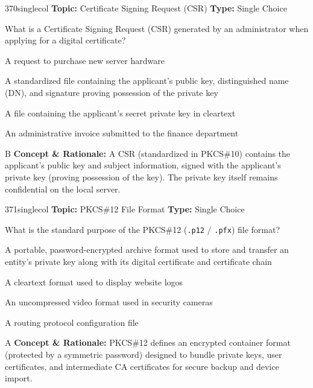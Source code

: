 \begin{qcard}{370}{singlecol}
\textcolor{darkslate!75}{\small\textbf{Topic:} Certificate Signing Request (CSR) \hfill \textbf{Type:} Single Choice}\vspace{0.4em}\par
What is a Certificate Signing Request (CSR) generated by an administrator when applying for a digital certificate?
\begin{qoptions}
\item A request to purchase new server hardware
\item A standardized file containing the applicant's public key, distinguished name (DN), and signature proving possession of the private key
\item A file containing the applicant's secret private key in cleartext
\item An administrative invoice submitted to the finance department
\end{qoptions}
\end{qcard}
\nopagebreak
\begin{explainbox}{B}
\textbf{Concept \& Rationale:} A CSR (standardized in PKCS\#10) contains the applicant's public key and subject information, signed with the applicant's private key (proving possession of the key). The private key itself remains confidential on the local server.
\end{explainbox}

\begin{qcard}{371}{singlecol}
\textcolor{darkslate!75}{\small\textbf{Topic:} PKCS\#12 File Format \hfill \textbf{Type:} Single Choice}\vspace{0.4em}\par
What is the standard purpose of the PKCS\#12 (\texttt{.p12} / \texttt{.pfx}) file format?
\begin{qoptions}
\item A portable, password-encrypted archive format used to store and transfer an entity's private key along with its digital certificate and certificate chain
\item A cleartext format used to display website logos
\item An uncompressed video format used in security cameras
\item A routing protocol configuration file
\end{qoptions}
\end{qcard}
\nopagebreak
\begin{explainbox}{A}
\textbf{Concept \& Rationale:} PKCS\#12 defines an encrypted container format (protected by a symmetric password) designed to bundle private keys, user certificates, and intermediate CA certificates for secure backup and device import.
\end{explainbox}

